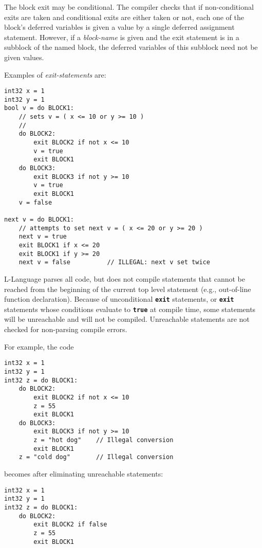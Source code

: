 \documentclass[12pt]{article}
\newcommand{\TT}[1]{{\tt \bfseries #1}}
\newenvironment{indpar}[1][0.3in]%
	{\begin{list}{}%
		     {\setlength{\itemsep}{0in}%
		      \setlength{\topsep}{0in}%
		      \setlength{\parsep}{1ex}%
		      \setlength{\labelwidth}{#1}%
		      \setlength{\leftmargin}{#1}%
		      \addtolength{\leftmargin}{\labelsep}}%
	 \item}%
	{\end{list}}
\begin{document}
The block exit may be conditional.  The compiler checks that
if non-conditional exits are taken and conditional
exits are either taken or not, each one of the block's
deferred variables is given a value by a single deferred assignment statement.
However, if a {\em block-name} is given and the exit statement is in
a subblock of the named block,
the deferred variables of this subblock
need not be given values.

Examples of {\em exit-statements} are:

\begin{indpar}\begin{verbatim}
int32 x = 1
int32 y = 1
bool v = do BLOCK1:
    // sets v = ( x <= 10 or y >= 10 )
    //
    do BLOCK2:
        exit BLOCK2 if not x <= 10
        v = true
        exit BLOCK1
    do BLOCK3:
        exit BLOCK3 if not y >= 10
        v = true
        exit BLOCK1
    v = false

next v = do BLOCK1:
    // attempts to set next v = ( x <= 20 or y >= 20 )
    next v = true
    exit BLOCK1 if x <= 20
    exit BLOCK1 if y >= 20
    next v = false          // ILLEGAL: next v set twice
\end{verbatim}\end{indpar}

L-Language parses all code, but does not compile statements that
cannot be reached from the beginning of the current top level
statement (e.g., out-of-line function declaration).  Because
of unconditional \TT{exit} statements, or \TT{exit} statements
whose conditions evaluate to \TT{true} at compile time,
some statements will be unreachable and will not be compiled.
Unreachable statements are not checked for non-parsing compile
errors.

For example, the code
\begin{indpar}\begin{verbatim}
int32 x = 1
int32 y = 1
int32 z = do BLOCK1:
    do BLOCK2:
        exit BLOCK2 if not x <= 10
        z = 55
        exit BLOCK1
    do BLOCK3:
        exit BLOCK3 if not y >= 10
        z = "hot dog"    // Illegal conversion
        exit BLOCK1
    z = "cold dog"       // Illegal conversion
\end{verbatim}\end{indpar}

becomes after eliminating unreachable statements:
\begin{indpar}\begin{verbatim}
int32 x = 1
int32 y = 1
int32 z = do BLOCK1:
    do BLOCK2:
        exit BLOCK2 if false
        z = 55
        exit BLOCK1
\end{verbatim}\end{indpar}
\end{document}
